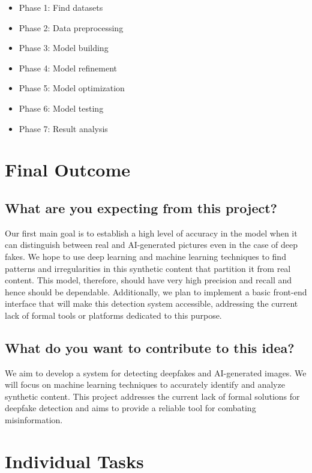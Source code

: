 \documentclass[10pt,twocolumn,letterpaper]{article}
\begin{document}
\begin{itemize}\setlength\itemsep{-0.4em}
    \item Phase 1: Find datasets
    \item Phase 2: Data preprocessing
    \item Phase 3: Model building
    \item Phase 4: Model refinement
    \item Phase 5: Model optimization
    \item Phase 6: Model testing
    \item Phase 7: Result analysis
\end{itemize}


\section{Final Outcome}

\subsection{What are you expecting from this project?}

Our first main goal is to establish a high level of accuracy in the model when it can distinguish between real and AI-generated pictures even in the case of deep fakes. 
We hope to use deep learning and machine learning techniques to find patterns and irregularities in this synthetic content that partition it from real content. 
This model, therefore, should have very high precision and recall and hence should be dependable.
Additionally, we plan to implement a basic front-end interface that will make this detection system accessible, addressing the current lack of formal tools or platforms dedicated to this purpose.

\subsection{What do you want to contribute to this idea?}
We aim to develop a system for detecting deepfakes and AI-generated images. We will focus on machine learning techniques to accurately identify and analyze synthetic content. This project addresses the current lack of formal solutions for deepfake detection and aims to provide a reliable tool for combating misinformation.

\section{Individual Tasks}
\end{document}
